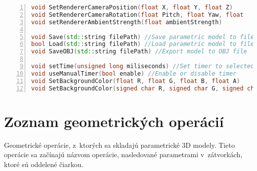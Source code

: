 \begin{lstlisting}[numbers=left,language=c++]
void SetRendererCameraPosition(float X, float Y, float Z)
void SetRendererCameraRotation(float Pitch, float Yaw, float 
void setRendererAmbientStrength(float ambientStrength)

void Save(std::string filePath) //Save parametric model to file
bool Load(std::string filePath) //Load parametric model to file
void SaveOBJ(std::string filePath) //Export model to OBJ file

void setTime(unsigned long miliseconds) //Set timer to selected time
void useManualTimer(bool enable) //Enable or disable timer
void SetBackgroundColor(float R, float G, float B, float A) 
void SetBackgroundColor(signed char R, signed char G, signed char B, signed char A)
\end{lstlisting}

\chapter{Zoznam geometrických operácií}
\label{Priloha:zoznamGeometrickychOperacii}
Geometrické operácie, z~ktorých sa skladajú parametrické 3D modely. Tieto operácie sa začínajú názvom operácie, nasledované parametrami v~zátvorkách, ktoré sú oddelené čiarkou.


